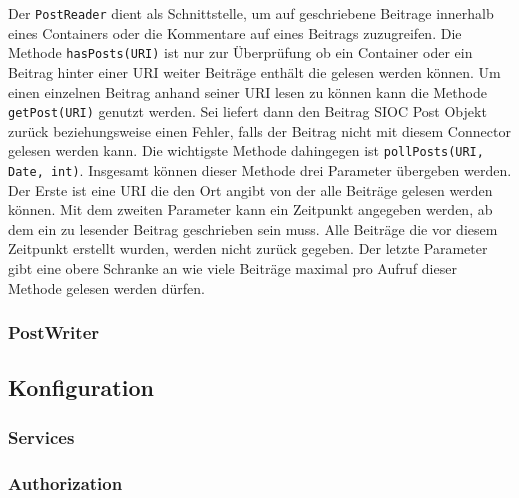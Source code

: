 Der \texttt{PostReader} dient als Schnittstelle, um auf geschriebene Beitrage innerhalb eines Containers oder die Kommentare auf eines Beitrags zuzugreifen. Die Methode \texttt{hasPosts(URI)} ist nur zur Überprüfung ob ein Container oder ein Beitrag hinter einer URI weiter Beiträge enthält die gelesen werden können. Um einen einzelnen Beitrag anhand seiner URI lesen zu können kann die Methode \texttt{getPost(URI)}  genutzt werden. Sei liefert dann den Beitrag SIOC Post Objekt zurück beziehungsweise einen Fehler, falls der Beitrag nicht mit diesem Connector gelesen werden kann. Die wichtigste Methode dahingegen ist \texttt{pollPosts(URI, Date, int)}. Insgesamt können dieser Methode drei Parameter übergeben werden. Der Erste ist eine URI die den Ort angibt von der alle Beiträge gelesen werden können. Mit dem zweiten Parameter kann ein Zeitpunkt angegeben werden, ab dem ein zu lesender Beitrag geschrieben sein muss. Alle Beiträge die vor diesem Zeitpunkt erstellt wurden, werden nicht zurück gegeben. Der letzte Parameter gibt eine obere Schranke an wie viele Beiträge maximal pro Aufruf dieser Methode gelesen werden dürfen.


\subsubsection{PostWriter} %
\label{ssub:postwriter}





\subsection{Konfiguration} %
\label{sub:konfiguration}

\subsubsection{Services} %
\label{ssub:services}


\subsubsection{Authorization} %
\label{ssub:authorization}


